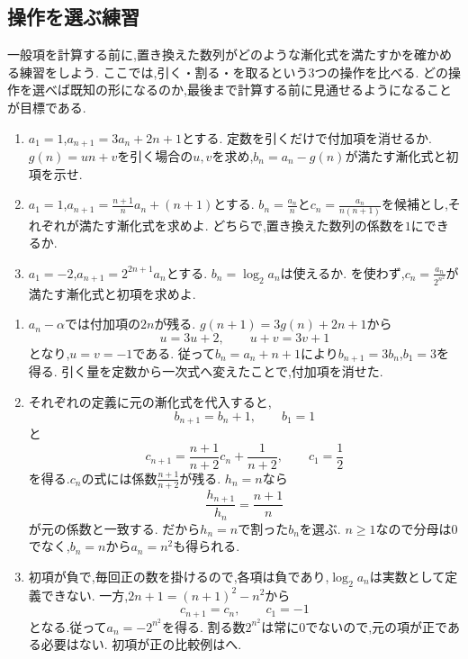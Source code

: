 \subsection{操作を選ぶ練習}\label{節：操作を選ぶ練習}
一般項を計算する前に,置き換えた数列がどのような漸化式を満たすかを確かめる練習をしよう.
ここでは,引く・割る・を取るという3つの操作を比べる.
どの操作を選べば既知の形になるのか,最後まで計算する前に見通せるようになることが目標である.

\noindent{}\par\nobreak
\begin{enumerate}[format=\bookitemlink{operation-choice}{problem}{answer}]
  \item $a_1=1$,$a_{n+1}=3a_n+2n+1$とする.
    定数を引くだけで付加項を消せるか.
    $g(n)=un+v$を引く場合の$u,v$を求め,$b_n=a_n-g(n)$が満たす漸化式と初項を示せ.
  \item $a_1=1$,$a_{n+1}=\frac{n+1}{n}a_n+(n+1)$とする.
    $b_n=\frac{a_n}{n}$と$c_n=\frac{a_n}{n(n+1)}$を候補とし,それぞれが満たす漸化式を求めよ.
    どちらで,置き換えた数列の係数を$1$にできるか.
  \item $a_1=-2$,$a_{n+1}=2^{2n+1}a_n$とする.
    $b_n=\log_2a_n$は使えるか.
    を使わず,$c_n=\frac{a_n}{2^{n^2}}$が満たす漸化式と初項を求めよ.
\end{enumerate}

\noindent{}\par\nobreak
\begin{enumerate}[format=\bookitemlink{operation-choice}{answer}{problem}]
  \item $a_n-\alpha$では付加項の$2n$が残る.
    $g(n+1)=3g(n)+2n+1$から
    \[
      u=3u+2,\qquad u+v=3v+1
    \]
    となり,$u=v=-1$である.
    従って$b_n=a_n+n+1$により$b_{n+1}=3b_n$,$b_1=3$を得る.
    引く量を定数から一次式へ変えたことで,付加項を消せた.

  \item それぞれの定義に元の漸化式を代入すると,
    \[
      b_{n+1}=b_n+1,\qquad b_1=1
    \]
    と
    \[
      c_{n+1}=\frac{n+1}{n+2}c_n+\frac{1}{n+2},\qquad c_1=\frac12
    \]
    を得る.$c_n$の式には係数$\frac{n+1}{n+2}$が残る.
    $h_n=n$なら
    \[
      \frac{h_{n+1}}{h_n}=\frac{n+1}{n}
    \]
    が元の係数と一致する.
    だから$h_n=n$で割った$b_n$を選ぶ.
    $n\ge1$なので分母は0でなく,$b_n=n$から$a_n=n^2$も得られる.

  \item 初項が負で,毎回正の数を掛けるので,各項は負であり,$\log_2a_n$は実数として定義できない.
    一方,$2n+1=(n+1)^2-n^2$から
    \[
      c_{n+1}=c_n,\qquad c_1=-1
    \]
    となる.従って$a_n=-2^{n^2}$を得る.
    割る数$2^{n^2}$は常に0でないので,元の項が正である必要はない.
    初項が正の比較例はへ.
\end{enumerate}

